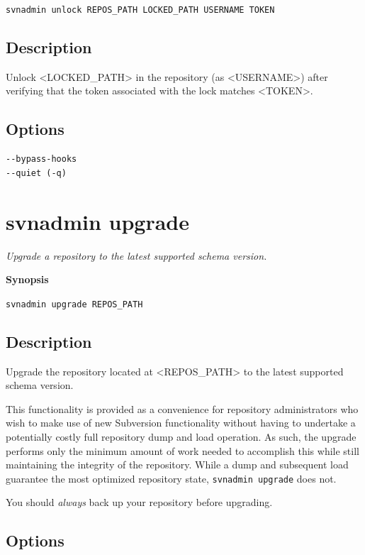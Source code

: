 \texttt{svnadmin\ unlock\ REPOS\_PATH\ LOCKED\_PATH\ USERNAME\ TOKEN}

\subsection{Description}

Unlock \textless LOCKED\_PATH\textgreater{} in the repository (as
\textless USERNAME\textgreater) after verifying that the token
associated with the lock matches \textless TOKEN\textgreater.

\subsection{Options}

\begin{verbatim}
--bypass-hooks
--quiet (-q)
\end{verbatim}

\section{svnadmin upgrade}\label{svn.ref.svnadmin.c.upgrade}

\emph{Upgrade a repository to the latest supported schema version.}

\textbf{Synopsis}

\texttt{svnadmin\ upgrade\ REPOS\_PATH}

\subsection{Description}

Upgrade the repository located at \textless REPOS\_PATH\textgreater{} to
the latest supported schema version.

This functionality is provided as a convenience for repository
administrators who wish to make use of new Subversion functionality
without having to undertake a potentially costly full repository dump
and load operation. As such, the upgrade performs only the minimum
amount of work needed to accomplish this while still maintaining the
integrity of the repository. While a dump and subsequent load guarantee
the most optimized repository state, \texttt{svnadmin\ upgrade} does
not.

You should \emph{always} back up your repository before upgrading.

\subsection{Options}

